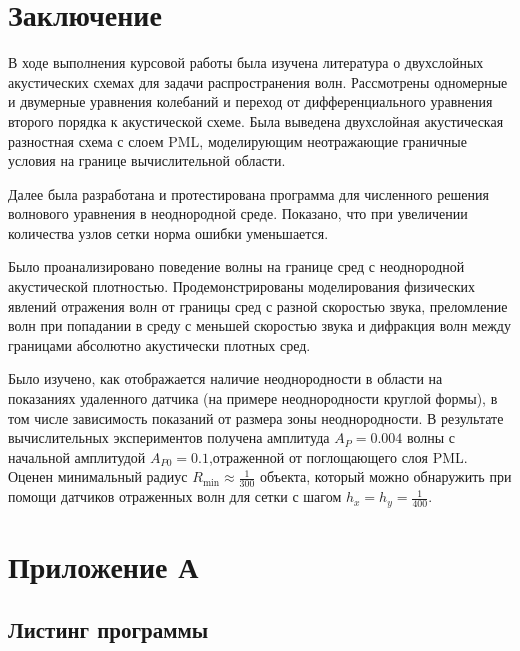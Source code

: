 \documentclass[a4paper, fontsize=14pt]{article}
\begin{document}
\clearpage

\section*{Заключение}

В ходе выполнения курсовой работы была изучена литература о двухслойных акустических схемах
для задачи распространения волн. Рассмотрены одномерные и двумерные уравнения колебаний и переход от
дифференциального уравнения второго порядка к акустической схеме. 
Была выведена двухслойная акустическая разностная схема с
слоем PML, моделирующим неотражающие граничные условия на границе вычислительной области.

Далее была разработана и протестирована программа для численного решения волнового
уравнения в неоднородной среде. Показано, что при увеличении количества узлов сетки норма ошибки
уменьшается.

Было проанализировано поведение волны на границе сред с неоднородной
акустической плотностью. 
Продемонстрированы моделирования физических явлений отражения волн от
границы сред с разной скоростью звука, преломление волн при попадании в среду с меньшей скоростью
звука и дифракция волн между границами абсолютно акустически плотных сред.

Было изучено, как отображается наличие неоднородности в области на показаниях удаленного датчика (на
примере неоднородности круглой формы), в том числе зависимость показаний от размера зоны
неоднородности.
В результате
вычислительных экспериментов получена амплитуда $A_P = 0.004$ волны с начальной амплитудой $A_{P0} =
0.1$,отраженной от поглощающего слоя PML. Оценен минимальный радиус $R_\text{min} \approx \frac{1}{300}$ 
объекта, который можно обнаружить при помощи датчиков отраженных волн для сетки с шагом
$h_x = h_y = \frac{1}{400}$. 

\newpage


\printbibliography

\newpage
\section*{Приложение А}
\subsection*{Листинг программы}










\end{document}
